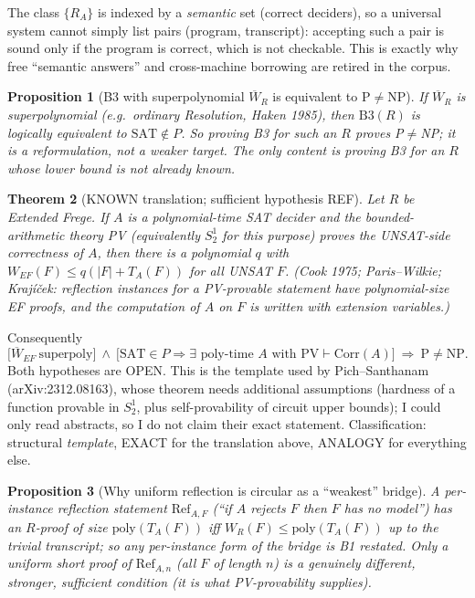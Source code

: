 \documentclass[11pt]{article}
\newtheorem{proposition}{Proposition}
\newtheorem{theorem}[proposition]{Theorem}
\begin{document}
\noindent The class $\{R_A\}$ is indexed by a \emph{semantic} set (correct deciders), so a universal system cannot simply list pairs (program, transcript): accepting such a pair is sound only if the program is correct, which is not checkable. This is exactly why free ``semantic answers'' and cross-machine borrowing are retired in the corpus.

\begin{proposition}[B3 with superpolynomial $\overline W_R$ is equivalent to P$\ne$NP]
If $\overline W_R$ is superpolynomial (e.g.\ ordinary Resolution, Haken 1985), then $\mathrm{B3}(R)$ is logically equivalent to $\mathrm{SAT}\notin P$. So proving B3 for such an $R$ proves P$\ne$NP; it is a reformulation, not a weaker target. The only content is proving B3 for an $R$ whose lower bound is \emph{not} already known.
\end{proposition}

\begin{theorem}[KNOWN translation; sufficient hypothesis REF]
Let $R$ be Extended Frege. If $A$ is a polynomial-time SAT decider and the bounded-arithmetic theory PV (equivalently $S^1_2$ for this purpose) proves the UNSAT-side correctness of $A$, then there is a polynomial $q$ with $W_{EF}(F)\le q(|F|+T_A(F))$ for all UNSAT $F$. (Cook 1975; Paris--Wilkie; Krajíček: reflection instances for a PV-provable statement have polynomial-size EF proofs, and the computation of $A$ on $F$ is written with extension variables.)
\end{theorem}
Consequently
\[
\bigl[\overline W_{EF}\ \text{superpoly}\bigr]\ \wedge\ \bigl[\mathrm{SAT}\in P\Rightarrow\exists\text{ poly-time }A\text{ with PV}\vdash\mathrm{Corr}(A)\bigr]\ \Longrightarrow\ \mathrm{P}\neq\mathrm{NP}.
\]
Both hypotheses are OPEN. This is the template used by Pich--Santhanam (arXiv:2312.08163), whose theorem needs additional assumptions (hardness of a function provable in $S^1_2$, plus self-provability of circuit upper bounds); I could only read abstracts, so I do not claim their exact statement. Classification: structural \emph{template}, EXACT for the translation above, ANALOGY for everything else.

\begin{proposition}[Why uniform reflection is circular as a ``weakest'' bridge]
A per-instance reflection statement $\mathrm{Ref}_{A,F}$ (``if $A$ rejects $F$ then $F$ has no model'') has an $R$-proof of size $\mathrm{poly}(T_A(F))$ iff $W_R(F)\le\mathrm{poly}(T_A(F))$ up to the trivial transcript; so any per-instance form of the bridge is B1 restated. Only a \emph{uniform} short proof of $\mathrm{Ref}_{A,n}$ (all $F$ of length $n$) is a genuinely different, stronger, sufficient condition (it is what PV-provability supplies).
\end{proposition}
\end{document}
